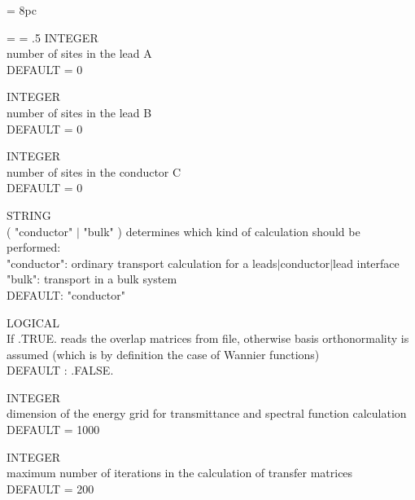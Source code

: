 \newdimen\descindent \descindent = 8pc
{\noindent \leftskip = \descindent \parskip = .5\baselineskip
{}%
INTEGER \\ number of sites in the lead A
\\ DEFAULT = 0 \par

\noindent{}%
INTEGER \\ number of sites in the lead B \\ DEFAULT = 0 \par

\noindent{}%
INTEGER \\ number of sites in the conductor C \\ DEFAULT = 0 \par

\noindent{}%
STRING \\ ( "conductor" $\mid$ "bulk" )
            determines which kind of calculation should be performed:\\
            "conductor":  ordinary transport calculation for a leads$\mid$conductor$\mid$lead
                          interface\\
            "bulk": transport in a bulk system\\
            DEFAULT: "conductor" \par

\noindent{}%
LOGICAL \\ If .TRUE. reads the overlap matrices from file, otherwise basis orthonormality
            is assumed (which is by definition the case of Wannier functions)\\
            DEFAULT : .FALSE. \par

\noindent{}%
INTEGER \\ dimension of the energy grid for transmittance and spectral function
            calculation \\ DEFAULT = 1000 \par

\noindent{}%
INTEGER \\ maximum number of iterations in the calculation of transfer matrices \\ DEFAULT = 200 \par

}
